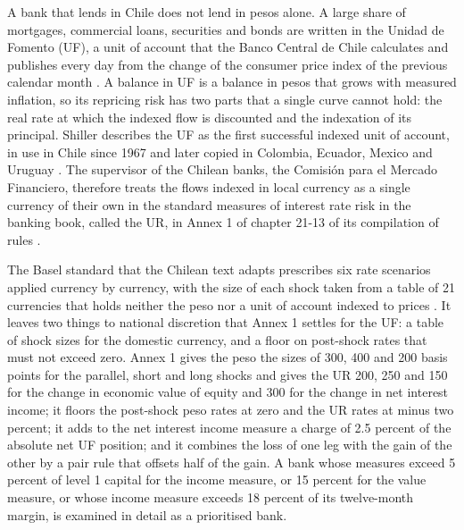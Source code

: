 A bank that lends in Chile does not lend in pesos alone. A large share of mortgages, commercial loans, securities and bonds are written in the Unidad de Fomento (UF), a unit of account that the Banco Central de Chile calculates and publishes every day from the change of the consumer price index of the previous calendar month \citep{BCCh_UF}. A balance in UF is a balance in pesos that grows with measured inflation, so its repricing risk has two parts that a single curve cannot hold: the real rate at which the indexed flow is discounted and the indexation of its principal. Shiller describes the UF as the first successful indexed unit of account, in use in Chile since 1967 and later copied in Colombia, Ecuador, Mexico and Uruguay \citep{Shiller1998}. The supervisor of the Chilean banks, the Comisi\'on para el Mercado Financiero, therefore treats the flows indexed in local currency as a single currency of their own in the standard measures of interest rate risk in the banking book, called the UR, in Annex 1 of chapter 21-13 of its compilation of rules \citep{CMF_RAN_21_13}.

The Basel standard that the Chilean text adapts prescribes six rate scenarios applied currency by currency, with the size of each shock taken from a table of 21 currencies that holds neither the peso nor a unit of account indexed to prices \citep{BCBS_d368,BCBS_SRP31,BCBS_d578}. It leaves two things to national discretion that Annex 1 settles for the UF: a table of shock sizes for the domestic currency, and a floor on post-shock rates that must not exceed zero. Annex 1 gives the peso the sizes of 300, 400 and 200 basis points for the parallel, short and long shocks and gives the UR 200, 250 and 150 for the change in economic value of equity and 300 for the change in net interest income; it floors the post-shock peso rates at zero and the UR rates at minus two percent; it adds to the net interest income measure a charge of 2.5 percent of the absolute net UF position; and it combines the loss of one leg with the gain of the other by a pair rule that offsets half of the gain. A bank whose measures exceed 5 percent of level 1 capital for the income measure, or 15 percent for the value measure, or whose income measure exceeds 18 percent of its twelve-month margin, is examined in detail as a prioritised bank.

